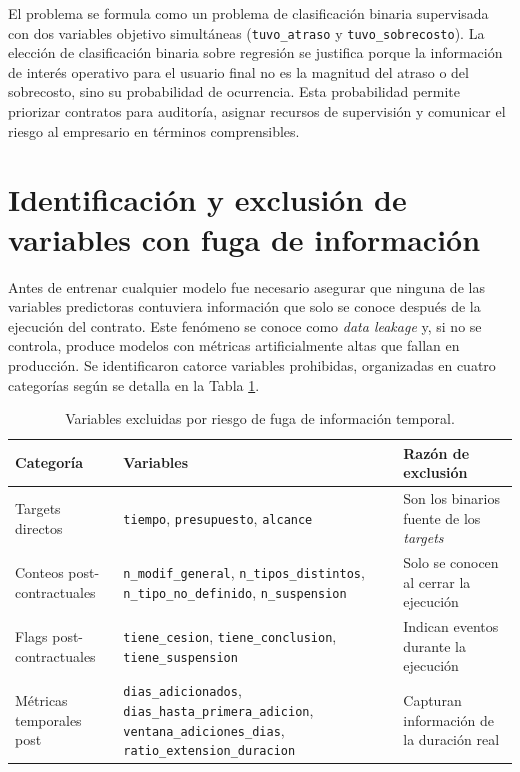 \documentclass[12pt,letterpaper,oneside]{report}
\begin{document}
El problema se formula como un problema de clasificación binaria supervisada
con dos variables objetivo simultáneas (\texttt{tuvo\_atraso} y
\texttt{tuvo\_sobrecosto}). La elección de clasificación binaria sobre
regresión se justifica porque la información de interés operativo para el
usuario final no es la magnitud del atraso o del sobrecosto, sino su
probabilidad de ocurrencia. Esta probabilidad permite priorizar contratos para
auditoría, asignar recursos de supervisión y comunicar el riesgo al empresario
en términos comprensibles.

\section{Identificación y exclusión de variables con fuga de información}

Antes de entrenar cualquier modelo fue necesario asegurar que ninguna de las
variables predictoras contuviera información que solo se conoce después de la
ejecución del contrato. Este fenómeno se conoce como \emph{data leakage} y, si
no se controla, produce modelos con métricas artificialmente altas que fallan
en producción. Se identificaron catorce variables prohibidas, organizadas en
cuatro categorías según se detalla en la Tabla \ref{tab:leakage}.

\begin{table}[h!]
\centering
\caption{Variables excluidas por riesgo de fuga de información temporal.}
\label{tab:leakage}
\small
\begin{tabular}{p{3.5cm}p{6cm}p{4.5cm}}
\toprule
\textbf{Categoría} & \textbf{Variables} & \textbf{Razón de exclusión} \\
\midrule
Targets directos & \texttt{tiempo}, \texttt{presupuesto}, \texttt{alcance} & Son los binarios fuente de los \emph{targets} \\
Conteos post-contractuales & \texttt{n\_modif\_general}, \texttt{n\_tipos\_distintos}, \texttt{n\_tipo\_no\_definido}, \texttt{n\_suspension} & Solo se conocen al cerrar la ejecución \\
Flags post-contractuales & \texttt{tiene\_cesion}, \texttt{tiene\_conclusion}, \texttt{tiene\_suspension} & Indican eventos durante la ejecución \\
Métricas temporales post & \texttt{dias\_adicionados}, \texttt{dias\_hasta\_primera\_adicion}, \texttt{ventana\_adiciones\_dias}, \texttt{ratio\_extension\_duracion} & Capturan información de la duración real \\
\bottomrule
\end{tabular}
\end{table}
\end{document}
